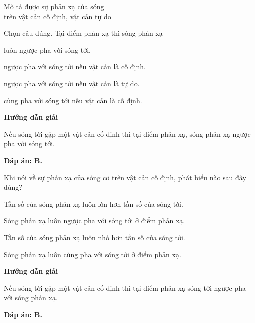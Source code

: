 \begin{dang}{Mô tả được sự phản xạ của sóng\\ trên vật cản cố định, vật cản tự do}
	{Chọn câu đúng. Tại điểm phản xạ thì sóng phản xạ
		\begin{mcq}
			\item luôn ngược pha với sóng tới.
			\item ngược pha với sóng tới nếu vật cản là cố định.
			\item ngược pha với sóng tới nếu vật cản là tự do. 
			\item cùng pha với sóng tới nếu vật cản là cố định.
		\end{mcq}
	}
	{
		\begin{center}
			\textbf{Hướng dẫn giải}
		\end{center}
		
		Nếu sóng tới gặp một vật cản cố định thì tại điểm phản xạ, sóng phản xạ ngược pha với sóng tới.
		
		\textbf{Đáp án: B.}
	}
	{Khi nói về sự phản xạ của sóng cơ trên vật cản cố định, phát biểu nào sau đây đúng?
		
		\begin{mcq}
			\item Tần số của sóng phản xạ luôn lớn hơn tần số của sóng tới. 
			\item Sóng phản xạ luôn ngược pha với sóng tới ở điểm phản xạ. 
			\item Tần số của sóng phản xạ luôn nhỏ hơn tần số của sóng tới. 
			\item Sóng phản xạ luôn cùng pha với sóng tới ở điểm phản xạ. 
		\end{mcq}
	}
	{\begin{center}
			\textbf{Hướng dẫn giải}
		\end{center}
		
		Nếu sóng tới gặp một vật cản cố định thì tại điểm phản xạ sóng tới ngược pha với sóng phản xạ.
		
		\textbf{Đáp án: B.}
	}
\end{dang}
